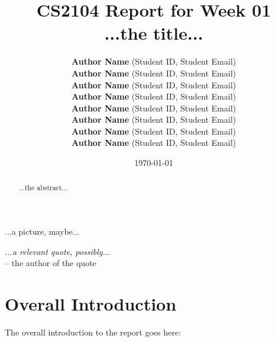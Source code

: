 \documentclass[12pt]{article}
\begin{document}
\title{
  CS2104 Report for Week 01
  \\
  ...the title...
}


\author{
    \textbf{Author Name} (Student ID, Student Email) \\
    \textbf{Author Name} (Student ID, Student Email) \\
    \textbf{Author Name} (Student ID, Student Email) \\
    \textbf{Author Name} (Student ID, Student Email) \\
    \textbf{Author Name} (Student ID, Student Email) \\
    \textbf{Author Name} (Student ID, Student Email) \\
    \textbf{Author Name} (Student ID, Student Email) \\
    \textbf{Author Name} (Student ID, Student Email)
}

\date{\today}

\maketitle

\begin{abstract}
...the abstract...
\end{abstract}

\vfill

\begin{center}
...a picture, maybe...
\end{center}

\vfill

\begin{flushright}
\emph{...a relevant quote, possibly...} \\
-- the author of the quote
\end{flushright}

\newpage 

\tableofcontents

\newpage


\section{Overall Introduction}
\label{sec:overall-introduction}

The overall introduction to the report goes here:
\end{document}
